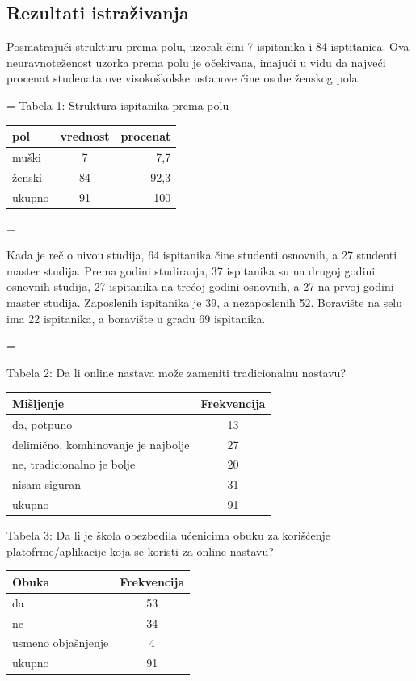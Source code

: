 \documentclass{article}
\begin{document}
\subsection{Rezultati istraživanja}

Posmatrajući strukturu prema polu, uzorak čini 7 ispitanika i 84 isptitanica. Ova neuravnoteženost uzorka prema polu je očekivana, imajući u vidu da najveći procenat studenata ove visokoškolske ustanove čine osobe ženskog pola.

\parskip=\baselineskip
Tabela 1: Struktura ispitanika prema polu
\begin{center}
  \begin{tabular}{ | l | c | r |}
    \hline
    pol & vrednost & procenat \\ \hline
    muški & 7 & 7,7 \\ \hline 
    ženski & 84 & 92,3 \\ \hline
    ukupno & 91 & 100 \\
    \hline
  \end{tabular}
\end{center}
\parskip=\baselineskip

Kada je reč o nivou studija, 64 ispitanika čine studenti osnovnih, a 27 studenti master studija. Prema godini studiranja, 37 ispitanika su na drugoj godini osnovnih studija, 27 ispitanika na trećoj godini osnovnih, a 27 na prvoj godini master studija. Zaposlenih ispitanika je 39, a nezaposlenih 52. Boravište na selu ima 22 ispitanika, a boravište u gradu 69 ispitanika. 

\parskip=\baselineskip

Tabela 2: Da li online nastava može zameniti tradicionalnu nastavu?
\begin{center}
  \begin{tabular}{ | l | c |}
    \hline
    Mišljenje & Frekvencija \\ \hline
    da, potpuno & 13  \\ \hline 
    delimično, komhinovanje je najbolje & 27  \\ \hline
    ne, tradicionalno je bolje & 20  \\ \hline
    nisam siguran & 31 \\ \hline
    ukupno &  91 \\
    \hline
  \end{tabular}
\end{center}

Tabela 3: Da li je škola obezbedila ućenicima obuku za korišćenje platofrme/aplikacije koja se koristi za online nastavu?
\begin{center}
  \begin{tabular}{ | l | c |}
    \hline
    Obuka & Frekvencija \\ \hline
    da & 53  \\ \hline 
    ne & 34  \\ \hline
    usmeno objašnjenje & 4 \\ \hline
    ukupno &  91 \\
    \hline
  \end{tabular}
\end{center}
\end{document}
